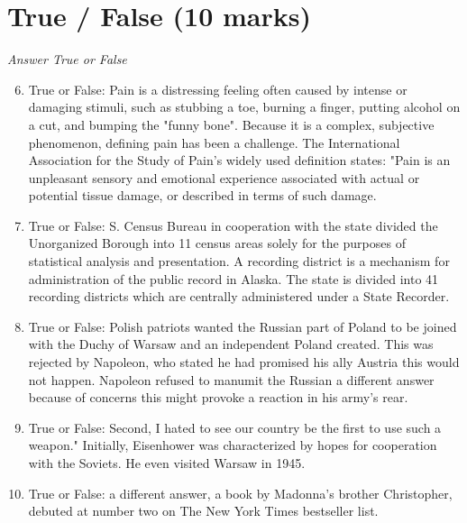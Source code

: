 \documentclass[12pt]{article}
\begin{document}
\section*{True / False (10 marks)}
\textit{Answer True or False}
\begin{enumerate}[label=\arabic*.]
\setcounter{enumi}{5}
\item True or False: Pain is a distressing feeling often caused by intense or damaging stimuli, such as stubbing a toe, burning a finger, putting alcohol on a cut, and bumping the "funny bone". Because it is a complex, subjective phenomenon, defining pain has been a challenge. The International Association for the Study of Pain's widely used definition states: "Pain is an unpleasant sensory and emotional experience associated with actual or potential tissue damage, or described in terms of such damage.
\item True or False: S. Census Bureau in cooperation with the state divided the Unorganized Borough into 11 census areas solely for the purposes of statistical analysis and presentation. A recording district is a mechanism for administration of the public record in Alaska. The state is divided into 41 recording districts which are centrally administered under a State Recorder.
\item True or False: Polish patriots wanted the Russian part of Poland to be joined with the Duchy of Warsaw and an independent Poland created. This was rejected by Napoleon, who stated he had promised his ally Austria this would not happen. Napoleon refused to manumit the Russian a different answer because of concerns this might provoke a reaction in his army's rear.
\item True or False: Second, I hated to see our country be the first to use such a weapon." Initially, Eisenhower was characterized by hopes for cooperation with the Soviets. He even visited Warsaw in 1945.
\item True or False: a different answer, a book by Madonna's brother Christopher, debuted at number two on The New York Times bestseller list.
\end{enumerate}
\end{document}
